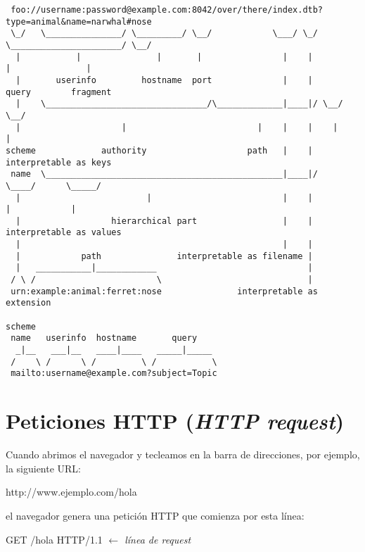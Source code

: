 \documentclass[a4paper,11pt]{memoir}
\begin{document}
\begin{tcolorbox}[float=htb,enhanced,left=2mm,drop fuzzy shadow,adjusted title=Partes de una URL]
\scriptsize
\begin{verbatim}
 foo://username:password@example.com:8042/over/there/index.dtb?type=animal&name=narwhal#nose
 \_/   \_______________/ \_________/ \__/            \___/ \_/ \______________________/ \__/
  |           |               |       |                |    |            |               |
  |       userinfo         hostname  port              |    |          query        fragment
  |    \________________________________/\_____________|____|/ \__/        \__/
  |                    |                          |    |    |    |          |
scheme             authority                    path   |    |    interpretable as keys
 name  \_______________________________________________|____|/      \____/      \_____/
  |                         |                          |    |         |            |
  |                  hierarchical part                 |    |    interpretable as values
  |                                                    |    |
  |            path               interpretable as filename |
  |   ___________|____________                              |
 / \ /                        \                             |
 urn:example:animal:ferret:nose               interpretable as extension

scheme
 name   userinfo  hostname       query
  _|__   ___|__   ____|____   _____|_____
 /    \ /      \ /         \ /           \
 mailto:username@example.com?subject=Topic
\end{verbatim}
\end{tcolorbox}

\section{Peticiones HTTP (\emph{HTTP request})}

Cuando abrimos el navegador y tecleamos en la barra de direcciones,
por ejemplo, la siguiente URL:

\begin{codigo}
http://www.ejemplo.com/hola
\end{codigo}

el navegador genera una petición HTTP que comienza por esta línea:

\begin{codigo}
GET /hola HTTP/1.1          \emph{\(\leftarrow\) línea de request}
\end{codigo}
\end{document}
